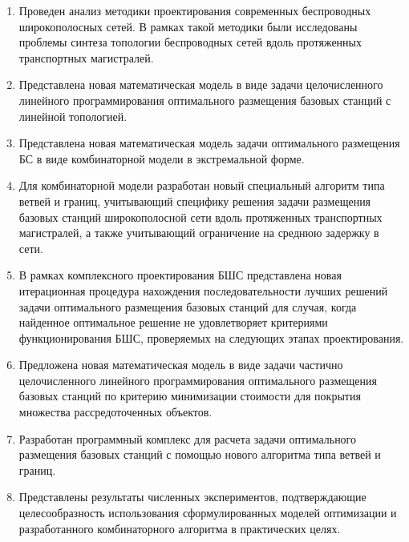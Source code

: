 
\begin{enumerate}
    \item Проведен анализ методики проектирования современных беспроводных широкополосных сетей. В рамках такой методики были исследованы проблемы синтеза топологии беспроводных сетей вдоль протяженных транспортных магистралей. 
    \item Представлена новая математическая модель в виде задачи целочисленного линейного программирования оптимального размещения базовых станций с линейной топологией.
    \item Представлена новая математическая модель задачи оптимального размещения БС в виде комбинаторной модели в экстремальной форме. 
    \item Для комбинаторной модели разработан новый специальный алгоритм типа ветвей и границ, учитывающий специфику решения задачи размещения базовых станций широкополосной сети вдоль протяженных транспортных магистралей, а также учитывающий ограничение на среднюю задержку в сети.  
    
    \item В рамках комплексного проектирования БШС представлена новая итерационная процедура нахождения последовательности лучших решений задачи оптимального размещения базовых станций для случая, когда найденное оптимальное решение не удовлетворяет  критериями функционирования БШС, проверяемых на следующих этапах проектирования.
    \item Предложена новая математическая модель в виде задачи частично целочисленного линейного программирования оптимального размещения базовых станций по критерию минимизации стоимости для покрытия множества рассредоточенных объектов. 
    \item Разработан программный комплекс для расчета задачи оптимального размещения базовых станций с помощью нового алгоритма типа ветвей и границ.
    \item Представлены результаты численных экспериментов, подтверждающие целесообразность использования сформулированных моделей оптимизации и разработанного комбинаторного алгоритма в практических целях. 
\end{enumerate}

